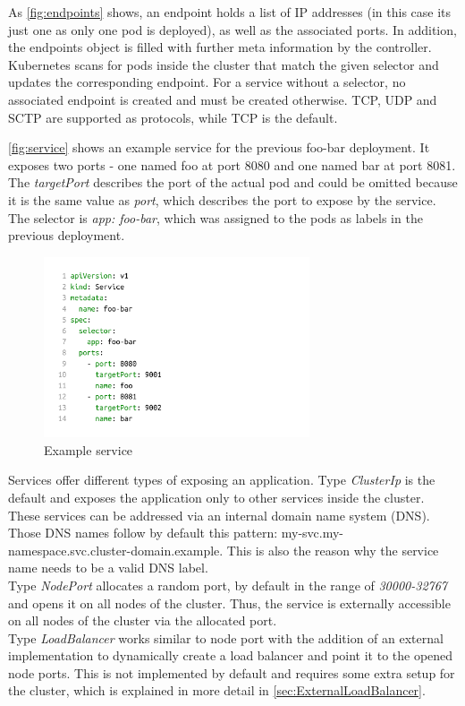 As \autoref{fig:endpoints} shows, an endpoint holds a list of IP addresses (in this case its just one as only one pod is deployed), as well as the associated ports.
In addition, the endpoints object is filled with further meta information by the controller.
Kubernetes scans for pods inside the cluster that match the given selector and updates the corresponding endpoint.
For a service without a selector, no associated endpoint is created and must be created otherwise.
TCP, UDP and SCTP are supported as protocols, while TCP is the default.

\autoref{fig:service} shows an example service for the previous foo-bar deployment.
It exposes two ports - one named foo at port 8080 and one named bar at port 8081.
The \textit{targetPort} describes the port of the actual pod and could be omitted because it is the same value as \textit{port}, which describes the port to expose by the service.
The selector is \textit{app: foo-bar}, which was assigned to the pods as labels in the previous deployment.

\begin{figure}[H]
    \centering
    \includegraphics[width=0.7\textwidth, left]{media/02/service}
    \caption{Example service}
    \label{fig:service}
\end{figure}

Services offer different types of exposing an application.
Type \textit{ClusterIp} is the default and exposes the application only to other services inside the cluster.
These services can be addressed via an internal domain name system (DNS).
Those DNS names follow by default this pattern: my-svc.my-namespace.svc.cluster-domain.example.
This is also the reason why the service name needs to be a valid DNS label.
\\
Type \textit{NodePort} allocates a random port, by default in the range of \textit{30000-32767} and opens it on all nodes of the cluster.
Thus, the service is externally accessible on all nodes of the cluster via the allocated port.
\\
Type \textit{LoadBalancer} works similar to node port with the addition of an external implementation to dynamically create a load balancer and point it to the opened node ports.
This is not implemented by default and requires some extra setup for the cluster, which is explained in more detail in \autoref{sec:ExternalLoadBalancer}.~\cite{KUBERNETES-SERVICE}

